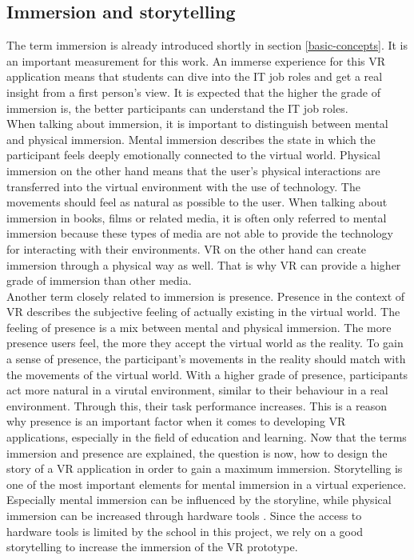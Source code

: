 \subsection{Immersion and storytelling}\label{immersion}
The term immersion is already introduced shortly in section \ref{basic-concepts}.
It is an important measurement for this work. An immerse experience for this VR application means that students can dive into the IT job roles and get a real insight from a first person's view. It is expected that the higher the grade of immersion is, the better participants can understand the IT job roles.\\
When talking about immersion, it is important to distinguish between  mental and physical immersion. Mental immersion describes the state in which the participant feels deeply emotionally connected to the virtual world. Physical immersion on the other hand means that the user's physical interactions are transferred into the virtual environment with the use of technology. The movements should feel as natural as possible to the user. When talking about immersion in books, films or related media, it is often only referred to mental immersion because these types of media are not able to provide the technology for interacting with their environments. VR on the other hand can create immersion through a physical way as well. That is why VR can provide a higher grade of immersion than other media. \cite{Tham.2018}\\
Another term closely related to immersion is presence. Presence in the context of VR describes the subjective feeling of actually existing in the virtual world. The feeling of presence is a mix between mental and physical immersion. The more presence users feel, the more they accept the virtual world as the reality. To gain a sense of presence, the participant's movements in the reality should match with the movements of the virtual world.
With a higher grade of presence, participants act more natural in a virutal environment, similar to their behaviour in a real environment. Through this, their task performance increases. This is a reason why presence is an important factor when it comes to developing VR applications, especially in the field of education and learning. \cite{Slater.1997}
\newpage
Now that the terms immersion and presence are explained, the question is now, how to design the story of a VR application in order to gain a maximum immersion. Storytelling is one of the most important elements for mental immersion in a virtual experience. Especially mental immersion can be influenced by the storyline, while physical immersion can be increased through hardware tools \cite{Tham.2018}. Since the access to hardware tools is limited by the school in this project, we rely on a good storytelling to increase the immersion of the VR prototype. \\
